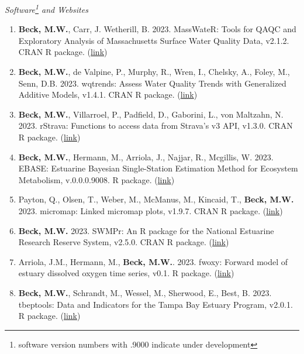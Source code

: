 \documentclass[letterpaper,12pt]{article}
\begin{document}
\vspace{\baselineskip} 
\centerline{\large{\textit{Software\footnote{software version numbers with .9000 indicate under development} and Websites}}}

\begin{enumerate}

\item \textbf{Beck, M.W.}, Carr, J. Wetherill, B. 2023. MassWateR: Tools for QAQC and Exploratory Analysis of Massachusetts Surface Water Quality Data, v2.1.2. CRAN R package. ({\footnotesize\href{https://massbays-tech.github.io/MassWateR/}{link}})

\item \textbf{Beck, M.W.}, de Valpine, P., Murphy, R., Wren, I., Chelsky, A., Foley, M., Senn, D.B. 2023. wqtrends: Assess Water Quality Trends with Generalized Additive Models, v1.4.1. CRAN R package. ({\footnotesize\href{https://tbep-tech.github.io/wqtrends/}{link}})

\item \textbf{Beck, M.W.}, Villarroel, P., Padfield, D., Gaborini, L., von Maltzahn, N. 2023. rStrava: Functions to access data from Strava's v3 API, v1.3.0. CRAN R package. ({\footnotesize\href{https://cran.r-project.org/web/packages/rStrava/index.html}{link}})

\item \textbf{Beck, M.W.}, Hermann, M., Arriola, J., Najjar, R., Mcgillis, W. 2023. EBASE: Estuarine Bayesian Single-Station Estimation Method for Ecosystem Metabolism, v.0.0.0.9008. R package. ({\footnotesize\href{https://fawda123.github.io/EBASE/}{link}})

\item Payton, Q., Olsen, T., Weber, M., McManus, M., Kincaid, T., \textbf{Beck, M.W.} 2023. micromap: Linked micromap plots, v1.9.7. CRAN R package. ({\footnotesize\href{https://cran.r-project.org/web/packages/micromap/index.html}{link}})

\item \textbf{Beck, M.W.} 2023. SWMPr: An R package for the National Estuarine Research Reserve System, v2.5.0. CRAN R package. ({\footnotesize\href{http://fawda123.github.io/SWMPr}{link}})

\item Arriola, J.M., Hermann, M., \textbf{Beck, M.W.}. 2023. fwoxy: Forward model of estuary dissolved oxygen time series, v0.1. R package. ({\footnotesize\href{https://github.com/jmarriola/fwoxy}{link}}) 

\item \textbf{Beck, M.W.}, Schrandt, M., Wessel, M., Sherwood, E., Best, B. 2023. tbeptools: Data and Indicators for the Tampa Bay Estuary Program, v2.0.1. R package. ({\footnotesize\href{https://tbep-tech.github.io/tbeptools/}{link}})


\end{enumerate}
\end{document}
